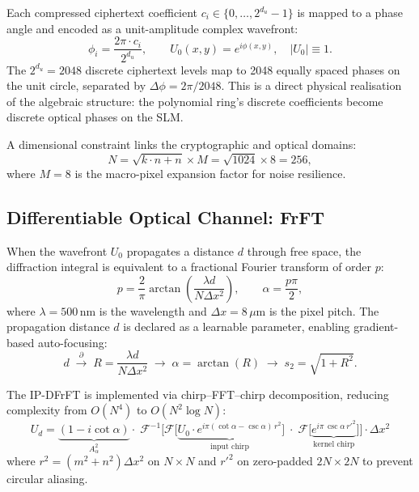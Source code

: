 \documentclass[11pt, a4paper]{article}
\theoremstyle{definition}
\theoremstyle{plain}
\begin{document}
Each compressed ciphertext coefficient $c_i \in \{0, \ldots, 2^{d_u}-1\}$
is mapped to a phase angle and encoded as a unit-amplitude complex
wavefront:
\begin{equation}
  \phi_i = \frac{2\pi \cdot c_i}{2^{d_u}}, \qquad
  U_0(x,y) = e^{i\phi(x,y)}, \quad |U_0| \equiv 1.
  \label{eq:phase_mod}
\end{equation}
The $2^{d_u} = 2048$ discrete ciphertext levels map to 2048 equally spaced
phases on the unit circle, separated by $\Delta\phi = 2\pi/2048$. This is
a direct physical realisation of the algebraic structure: the polynomial
ring's discrete coefficients become discrete optical phases on the SLM.

A dimensional constraint links the cryptographic and optical domains:
\begin{equation}
  N = \sqrt{k \cdot n + n} \times M = \sqrt{1024} \times 8 = 256,
  \label{eq:dim_constraint}
\end{equation}
where $M = 8$ is the macro-pixel expansion factor for noise resilience.


\subsection{Differentiable Optical Channel: FrFT}
\label{sec:frft}

When the wavefront $U_0$ propagates a distance $d$ through free space,
the diffraction integral is equivalent to a fractional Fourier transform of
order $p$:
\begin{equation}
  p = \frac{2}{\pi}\arctan\!\left(\frac{\lambda d}{N \Delta x^2}\right),
  \qquad \alpha = \frac{p\pi}{2},
  \label{eq:frft_order}
\end{equation}
where $\lambda = 500\,$nm is the wavelength and $\Delta x = 8\,\mu$m is
the pixel pitch. The propagation distance $d$ is declared as a learnable
parameter, enabling gradient-based auto-focusing:
\begin{equation}
  d \;\xrightarrow{\;\partial\;}\;
  R = \frac{\lambda d}{N\Delta x^2} \;\to\;
  \alpha = \arctan(R) \;\to\;
  s_2 = \sqrt{1 + R^2}.
  \label{eq:learnable_d}
\end{equation}

The IP-DFrFT is implemented via chirp--FFT--chirp decomposition, reducing
complexity from $O(N^4)$ to $O(N^2\log N)$:
\begin{equation}
\boxed{
  U_d = \underbrace{(1 - i\cot\alpha)}_{\displaystyle A_\alpha^2}
  \cdot\;\mathcal{F}^{-1}\!\Big[
    \mathcal{F}\!\big[\underbrace{U_0 \cdot
    e^{i\pi(\cot\alpha - \csc\alpha)\,r^2}}_{\text{input chirp}}\big]
    \;\cdot\;
    \mathcal{F}\!\big[\underbrace{e^{i\pi\,\csc\alpha\,r'^2}}_{\text{kernel chirp}}\big]
  \Big] \cdot \Delta x^2
}
\label{eq:frft_full}
\end{equation}
where $r^2 = (m^2+n^2)\Delta x^2$ on $N \times N$ and
$r'^2$ on zero-padded $2N \times 2N$ to prevent circular aliasing.
\end{document}
